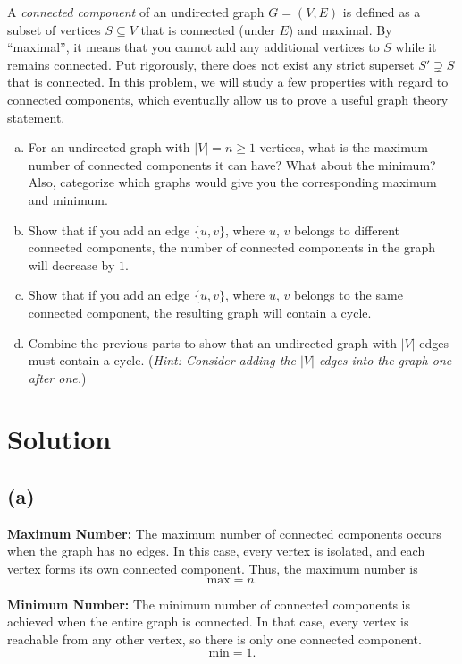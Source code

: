 \documentclass[11pt]{article}
\begin{document}
    \begin{tcolorbox}[title={Problem 3 (Connected Components, 30 pts)}] \setlength\parindent{1em}
    A \textit{connected component} of an undirected graph $G=(V, E)$ is defined as a subset of vertices $S\subseteq V$ that is connected (under $E$) and maximal. By ``maximal'', it means that you cannot add any additional vertices to $S$ while it remains connected. Put rigorously, there does not exist any strict superset $S'\supsetneq S$ that is connected. In this problem, we will study a few properties with regard to connected components, which eventually allow us to prove a useful graph theory statement.
    \begin{enumerate}[(a)]
    \item For an undirected graph with $|V|=n\geq1$ vertices, what is the maximum number of connected components it can have? What about the minimum? Also, categorize which graphs would give you the corresponding maximum and minimum.
    \item Show that if you add an edge $\{u,v\}$, where $u$, $v$ belongs to different connected components, the number of connected components in the graph will decrease by $1$.
    \item Show that if you add an edge $\{u,v\}$, where $u$, $v$ belongs to the same connected component, the resulting graph will contain a cycle.
    \item Combine the previous parts to show that an undirected graph with $|V|$ edges must contain a cycle. (\textit{Hint: Consider adding the $|V|$ edges into the graph one after one.})
    \end{enumerate}
    \end{tcolorbox}

    \section*{Solution}

    \subsection*{(a)}
    
    \textbf{Maximum Number:}  
    The maximum number of connected components occurs when the graph has no edges. In this case, every vertex is isolated, and each vertex forms its own connected component. Thus, the maximum number is
    \[
      \text{max} = n.
    \]
    
    \noindent \textbf{Minimum Number:}  
    The minimum number of connected components is achieved when the entire graph is connected. In that case, every vertex is reachable from any other vertex, so there is only one connected component.
    \[
      \text{min} = 1.
    \]
    
\end{document}
